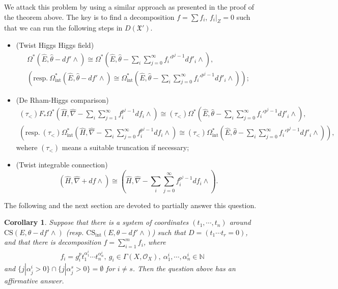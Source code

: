 \documentclass[12pt, a4paper]{article}
\newtheorem{corollary}{Corollary}[section]
\begin{document}
 We attack this problem by using a similar approach as presented in the proof of the theorem above. The key is to find a decomposition $f=\sum f_i$, $f_i|_Z=0$ such that we can run the following steps in $D(\mathfrak X')$.
 \begin{itemize}
\item[{\itshape Step 1}] (Twist Higgs Higgs field)
$$
\begin{array}{c}
\Omega^*(\hat E,\hat\theta-df'\wedge)\cong\Omega^*(\hat E,\hat\theta-\sum_i\sum_{j=0}^\infty f_i'^{p^j-1}df'_i\wedge),\\
(\mathrm{resp.}~\Omega_\mathrm{int}^*(\hat E,\hat\theta-df'\wedge)\cong\Omega_\mathrm{int}^*(\hat E,\hat\theta-\sum_i\sum_{j=0}^\infty f_i'^{p^j-1}df'_i\wedge));
\end{array}
$$
\item[{\itshape Step 2}] (De Rham-Higgs comparison)
$$
\begin{array}{c}
(\tau_<)F_*\Omega^*(\hat H,\hat\nabla-\sum_i\sum_{j=1}^\infty f_i^{p^j-1}df_i\wedge)\cong(\tau_<)\Omega^*(\hat E,\hat\theta-\sum_i\sum_{j=0}^\infty f_i'^{p^j-1}df'_i\wedge),\\
(\mathrm{resp.}~(\tau_<)\Omega_\mathrm{int}^*(\hat H,\hat\nabla-\sum_i\sum_{j=0}^\infty f_i^{p^j-1}df_i\wedge)\cong(\tau_<)\Omega_\mathrm{int}^*(\hat E,\hat\theta-\sum_i\sum_{j=0}^\infty f_i'^{p^j-1}df'_i\wedge)),
\end{array}
$$
wehere $(\tau_<)$ means a suitable truncation if necessary;
\item[{\itshape Step 3}] (Twist integrable connection) 
$$
(\hat H,\hat \nabla+df\wedge)\cong(\hat H,\hat\nabla-\sum_i\sum_{j=0}^\infty f_i^{p^j-1}df_i\wedge).
$$
\end{itemize}
The following and the next section are devoted to partially answer this question. 
 \begin{corollary}\label{C2}
 Suppose that there is a system of coordinates $(t_1,\cdots,t_n)$ around $\mathrm{CS}(E,\theta-df'\wedge)$ (resp. $\mathrm{CS}_\mathrm{int}(E,\theta-df'\wedge)$) such that $D=(t_1\cdots t_r=0)$, and that
there is decomposition $f=\sum_{i=1}^mf_i$, where
\begin{eqnarray}\label{coordinate term}
f_i=g_i^pt_1^{\alpha^i_1}\cdots t_n^{\alpha^i_n},~g_i\in\Gamma(X,\mathcal O_X),~\alpha^i_1,\cdots,\alpha^i_n\in\mathbb N
\end{eqnarray}
and $\{j|\alpha^i_j>0\}\cap\{j|\alpha^s_j>0\}=\emptyset$ for $i\neq s$. 
Then  the question above has an affirmative answer.
 \end{corollary}
\end{document}
